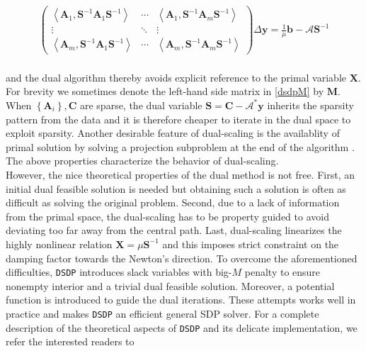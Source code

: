 \documentclass[10pt]{article}
\begin{document}
{{\begin{eqnarray} \label{dsdpM}
	\left(\begin{array}{ccc}
     \left\langle \mathbf{A}_1, \mathbf{S}^{- 1} \mathbf{A}_1 \mathbf{S}^{- 1} \right\rangle & \cdots &
     \left\langle \mathbf{A}_1, \mathbf{S}^{- 1} \mathbf{A}_m \mathbf{S}^{- 1} \right\rangle\\
     \vdots & \ddots & \vdots\\
     \left\langle \mathbf{A}_m, \mathbf{S}^{- 1} \mathbf{A}_1 \mathbf{S}^{- 1} \right\rangle & \cdots &
     \left\langle \mathbf{A}_m, \mathbf{S}^{- 1} \mathbf{A}_m \mathbf{S}^{- 1} \right\rangle
   \end{array}\right) \Delta \mathbf{y} = \frac{1}{\mu} \mathbf{b} - \mathcal{A} \mathbf{S}^{- 1}
\end{eqnarray}\\
and the dual algorithm thereby avoids explicit reference to the primal
variable $\mathbf{X}$. For brevity we sometimes denote the left-hand side matrix in \eqref{dsdpM} by $\mathbf{M}$.
When $\left\{ \mathbf{A}_i \right\}, \mathbf{C}$ are sparse, the dual variable $\mathbf{S} = \mathbf{C}
-\mathcal{A}^{\ast} \mathbf{y}$ inherits the sparsity pattern from the data and it is
therefore cheaper to iterate in the dual space to exploit sparsity.
Another desirable feature of dual-scaling is the availablity of primal
solution by solving a projection subproblem at the end of the algorithm \cite{benson2008algorithm}. The
above properties characterize the behavior of dual-scaling.\\

However, the nice theoretical properties of the dual method is not free. 
First, an initial dual feasible solution is needed but obtaining such a
solution is often as difficult as solving the original problem. Second, due to
a lack of information from the primal space, the dual-scaling has to be
property guided to avoid deviating too far away from the central path. Last,
dual-scaling linearizes the highly nonlinear relation $\mathbf{X} = \mu \mathbf{S}^{- 1}$ and
this imposes strict constraint on the damping factor towards the Newton's
direction. To overcome the aforementioned difficulties, {{\texttt{DSDP}}}
introduces slack variables with big-$M$ penalty to ensure nonempty interior
and a trivial dual feasible solution. Moreover, a potential function is introduced 
to guide the dual iterations. These attempts works
well in practice and makes {{\texttt{DSDP}}} an efficient general SDP solver.
For a complete description of the theoretical aspects of {{\texttt{DSDP}}} and
its delicate implementation, we refer the interested readers to
{\cite{benson2000solving, benson2008algorithm}}\\

}}
\end{document}

